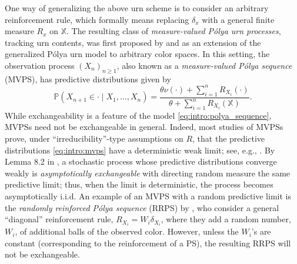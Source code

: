 \documentclass[a4paper]{article}
\theoremstyle{plain}
\theoremstyle{remark}
\theoremstyle{definition}
\newcommand{\Polya}{P\'{o}lya }
\begin{document}
One way of generalizing the above urn scheme is to consider an arbitrary reinforcement rule, which formally means replacing $\delta_x$ with a general finite measure $R_x$ on $\mathbb{X}$. The resulting class of \textit{measure-valued \Polya urn processes}, tracking urn contents, was first proposed by \cite{thacker2022} and \cite{mailler2017} as an extension of the generalized \Polya urn model to arbitrary color spaces. In this setting, the observation process $(X_n)_{n\geq1}$, also known as a \textit{measure-valued \Polya sequence} (MVPS), has predictive distributions given by
\begin{equation}\label{eq:intro:mvps}
\mathbb{P}(X_{n+1}\in\cdot\mid X_1,\ldots,X_n)=\frac{\theta\nu(\cdot)+\sum_{i=1}^nR_{X_i}(\cdot)}{\theta+\sum_{i=1}^nR_{X_i}(\mathbb{X})}.
\end{equation} 
While exchangeability is a feature of the model \eqref{eq:intro:polya_sequence}, MVPSs need not be exchangeable in general. Indeed, most studies of MVPSs prove, under ``irreducibility''-type assumptions on $R$, that the predictive distributions \eqref{eq:intro:mvps} have a deterministic weak limit; see, e.g., \cite{thacker2022,thacker2020,janson2021,janson2023,mailler2017,mailler2020}. By Lemma 8.2 in \cite{aldous1985exchangeability}, a stochastic process whose predictive distributions converge weakly is \textit{asymptotically exchangeable} with directing random measure the same predictive limit; thus, when the limit is deterministic, the process becomes asymptotically i.i.d. An example of an MVPS with a random predictive limit is the \textit{randomly reinforced \Polya sequence} (RRPS) by \cite{sariev2021,sariev2023,bassetti2010}, who consider a general ``diagonal'' reinforcement rule, $R_{X_i}=W_i\delta_{X_i}$, where they add a random number, $W_i$, of additional balls of the observed color. However, unless the $W_i$'s are constant (corresponding to the reinforcement of a PS), the resulting RRPS will not be exchangeable.
\end{document}
